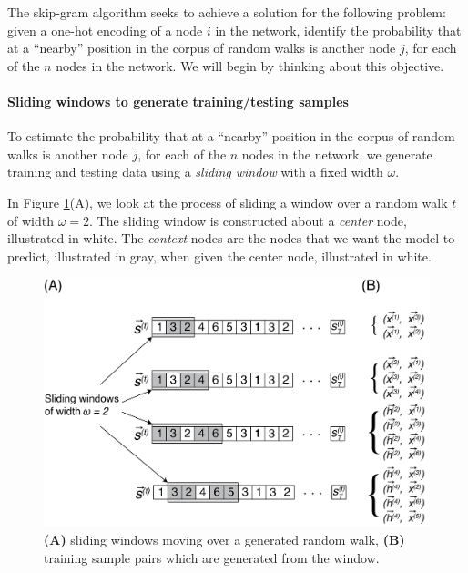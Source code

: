 The skip-gram algorithm seeks to achieve a solution for the following problem: given a one-hot encoding of a node $i$ in the network, identify the probability that at a ``nearby'' position in the corpus of random walks is another node $j$, for each of the $n$ nodes in the network. We will begin by thinking about this objective.

\paragraph*{Sliding windows to generate training/testing samples}

To estimate the probability that at a ``nearby'' position in the corpus of random walks is another node $j$, for each of the $n$ nodes in the network, we generate training and testing data using a \textit{sliding window} with a fixed width $\omega$. 

In Figure \ref{fig:next:diff:sliding_window}(A), we look at the process of sliding a window over a random walk $t$ of width $\omega = 2$. The sliding window is constructed about a \textit{center} node, illustrated in white. The \textit{context} nodes are the nodes that we want the model to predict, illustrated in gray, when given the center node, illustrated in white.

\begin{figure}
    \centering
    \includegraphics[width=\linewidth]{next/Images/window.png}
    \caption[Computing probability of two nodes being close]{\textbf{(A)} sliding windows moving over a generated random walk, \textbf{(B)} training sample pairs which are generated from the window.}
    \label{fig:next:diff:sliding_window}
\end{figure}


